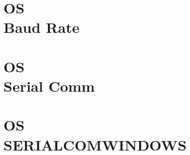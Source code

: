 \documentclass{wileySix}
\begin{document}
\chapter[Baudrate]
{OS\\ Baud Rate}


%

\chapter[Serial Communication di Linux]
{OS\\ Serial Comm}


\chapter[SERIALCOMWINDOWS]
{OS\\ SERIALCOMWINDOWS}


%

%

%

%
\end{document}
